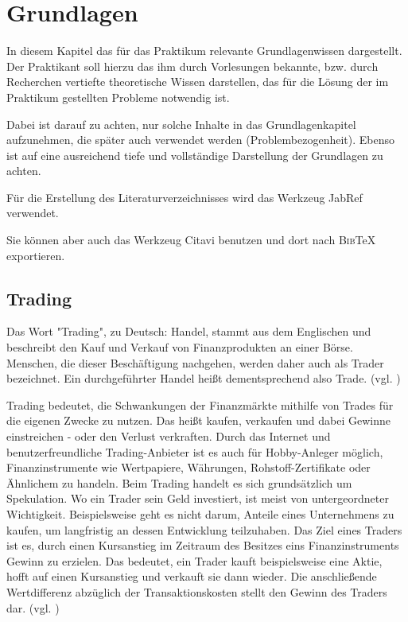 \documentclass[oneside]{ausarbeitung}
\begin{document}
\chapter{Grundlagen}
\label{cha:grundlagen}

In diesem Kapitel das für das Praktikum relevante Grundlagenwissen 
dargestellt. Der Praktikant soll hierzu das ihm durch Vorlesungen 
bekannte, bzw. durch Recherchen vertiefte theoretische Wissen 
darstellen, das für die Lösung der im Praktikum gestellten Probleme 
notwendig ist.

Dabei ist darauf zu achten, nur solche Inhalte in das Grundlagenkapitel 
aufzunehmen, die später auch verwendet werden (Problembezogenheit). 
Ebenso ist auf eine ausreichend tiefe und vollständige Darstellung der 
Grundlagen zu achten.

Für die Erstellung des Literaturverzeichnisses 
wird das Werkzeug JabRef\autocite{JabRef:JabRef} verwendet. 

Sie können aber auch das Werkzeug Citavi\autocite{SAS:Citavi} benutzen
und dort nach \textsc{Bib}\TeX{} exportieren.

\section{Trading}
\label{sec:trading}

Das Wort "Trading", zu Deutsch: Handel, stammt aus dem Englischen und beschreibt den Kauf und Verkauf von Finanzprodukten an einer Börse. Menschen, die dieser Beschäftigung nachgehen, werden daher auch als Trader bezeichnet. Ein durchgeführter Handel heißt dementsprechend also Trade. (vgl. \cite{trading_1})

Trading bedeutet, die Schwankungen der Finanzmärkte mithilfe von Trades für die eigenen Zwecke zu nutzen. Das heißt kaufen, verkaufen und dabei Gewinne einstreichen - oder den Verlust verkraften. Durch das Internet und benutzerfreundliche Trading-Anbieter ist es auch für Hobby-Anleger möglich, Finanzinstrumente wie Wertpapiere, Währungen, Rohstoff-Zertifikate oder Ähnlichem zu handeln. Beim Trading handelt es sich grundsätzlich um Spekulation. Wo ein Trader sein Geld investiert, ist meist von untergeordneter Wichtigkeit. Beispielsweise geht es nicht darum, Anteile eines Unternehmens zu kaufen, um langfristig an dessen Entwicklung teilzuhaben. Das Ziel eines Traders ist es, durch einen Kursanstieg im Zeitraum des Besitzes eins Finanzinstruments Gewinn zu erzielen. Das bedeutet, ein Trader kauft beispielsweise eine Aktie, hofft auf einen Kursanstieg und verkauft sie dann wieder. Die anschließende Wertdifferenz abzüglich der Transaktionskosten stellt den Gewinn des Traders dar. (vgl. \cite{trading_2})
\end{document}
